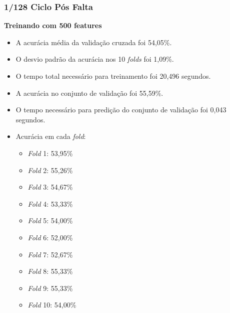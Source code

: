 \subsubsection{1/128 Ciclo Pós Falta}
\textbf{Treinando com 500 features}
\begin{itemize}
    \item A acurácia média da validação cruzada foi 54,05\%.
    \item O desvio padrão da acurácia nos 10 \textit{folds} foi 1,09\%.
    \item O tempo total necessário para treinamento foi 20,496 segundos.
    \item A acurácia no conjunto de validação foi 55,59\%.
    \item O tempo necessário para predição do conjunto de validação foi 0,043 segundos.
    \item Acurácia em cada \textit{fold}:
    \begin{itemize}
        \item \textit{Fold} 1: 53,95\%
        \item \textit{Fold} 2: 55,26\%
        \item \textit{Fold} 3: 54,67\%
        \item \textit{Fold} 4: 53,33\%
        \item \textit{Fold} 5: 54,00\%
        \item \textit{Fold} 6: 52,00\%
        \item \textit{Fold} 7: 52,67\%
        \item \textit{Fold} 8: 55,33\%
        \item \textit{Fold} 9: 55,33\%
        \item \textit{Fold} 10: 54,00\%
    \end{itemize}
\end{itemize}
